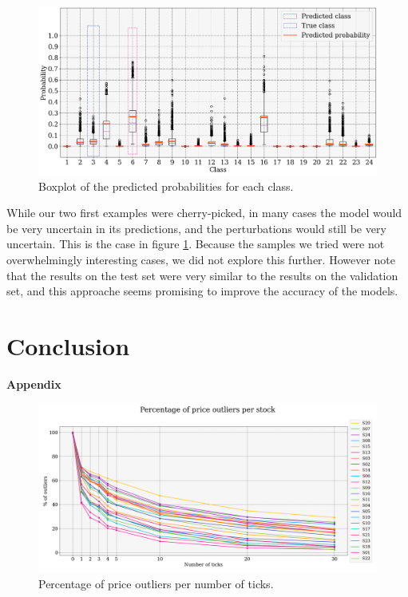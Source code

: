 \documentclass[switch, 11pt]{article}
\begin{document}
\begin{multicols}{2}
\begin{figure}[H]
        \centering
        \includegraphics[width=\columnwidth]{figures/predictions_3.png}
        \caption{Boxplot of the predicted probabilities for each class.}
        \label{fig:predictions_3}
    \end{figure}
    While our two first examples were cherry-picked, in many cases the model would be very uncertain in its predictions, and the perturbations would still be very uncertain. This is the case in figure \ref{fig:predictions_3}. Because the samples we tried were not overwhelmingly interesting cases, we did not explore this further. However note that the results on the test set were very similar to the results on the validation set, and this approache seems promising to improve the accuracy of the models.

    \section{Conclusion}

    \newpage
    

\end{multicols}

\newpage
\appendix
\begin{center}
    {\Large \bfseries Appendix} \\
\end{center}
\begin{figure}[H]
    \centering
    \includegraphics[width=\columnwidth]{figures/percentage_outliers_per_stock.png}
    \caption{Percentage of price outliers per number of ticks.}
    \label{fig:nb_outliers}
\end{figure}
\end{document}
